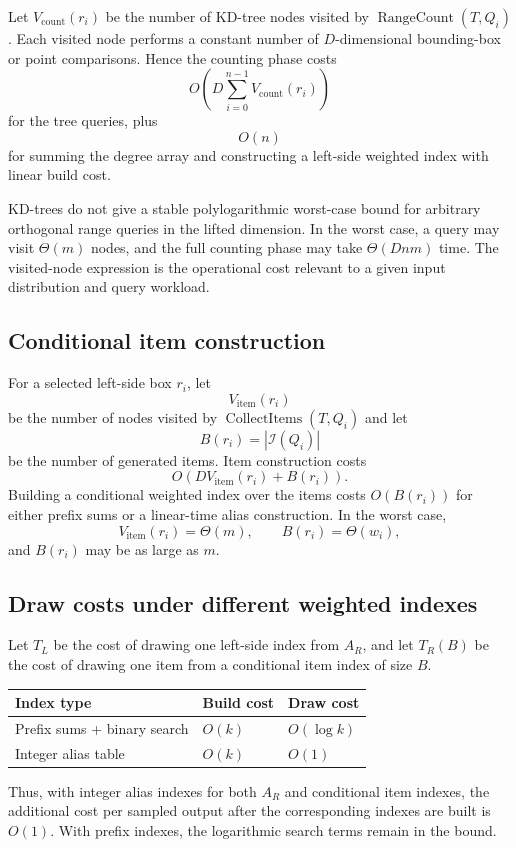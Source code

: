 \documentclass[11pt]{article}
\theoremstyle{definition}
\theoremstyle{plain}
\theoremstyle{remark}
\DeclareMathOperator{\RangeCount}{RangeCount}
\DeclareMathOperator{\CollectItems}{CollectItems}
\newcommand{\Items}{\mathcal I}
\begin{document}
Let $V_{\mathrm{count}}(r_i)$ be the number of KD-tree nodes visited by
$\RangeCount(T,Q_i)$.  Each visited node performs a constant number of $D$-dimensional
bounding-box or point comparisons.  Hence the counting phase costs
\[
  O\left(D\sum_{i=0}^{n-1}V_{\mathrm{count}}(r_i)\right)
\]
for the tree queries, plus
\[
  O(n)
\]
for summing the degree array and constructing a left-side weighted index with linear build
cost.

KD-trees do not give a stable polylogarithmic worst-case bound for arbitrary orthogonal range
queries in the lifted dimension.  In the worst case, a query may visit $\Theta(m)$ nodes, and
the full counting phase may take $\Theta(Dnm)$ time.  The visited-node expression is the
operational cost relevant to a given input distribution and query workload.

\subsection{Conditional item construction}

For a selected left-side box $r_i$, let
\[
  V_{\mathrm{item}}(r_i)
\]
be the number of nodes visited by $\CollectItems(T,Q_i)$ and let
\[
  B(r_i)=|\Items(Q_i)|
\]
be the number of generated items.  Item construction costs
\[
  O(DV_{\mathrm{item}}(r_i)+B(r_i)).
\]
Building a conditional weighted index over the items costs $O(B(r_i))$ for either prefix sums
or a linear-time alias construction.  In the worst case,
\[
  V_{\mathrm{item}}(r_i)=\Theta(m),
  \qquad
  B(r_i)=\Theta(w_i),
\]
and $B(r_i)$ may be as large as $m$.

\subsection{Draw costs under different weighted indexes}

Let $T_L$ be the cost of drawing one left-side index from $A_R$, and let
$T_R(B)$ be the cost of drawing one item from a conditional item index of size $B$.
\begin{center}
\begin{tabular}{lll}
\toprule
Index type & Build cost & Draw cost \\
\midrule
Prefix sums + binary search & $O(k)$ & $O(\log k)$ \\
Integer alias table & $O(k)$ & $O(1)$ \\
\bottomrule
\end{tabular}
\end{center}
Thus, with integer alias indexes for both $A_R$ and conditional item indexes, the additional
cost per sampled output after the corresponding indexes are built is $O(1)$.  With prefix
indexes, the logarithmic search terms remain in the bound.
\end{document}
